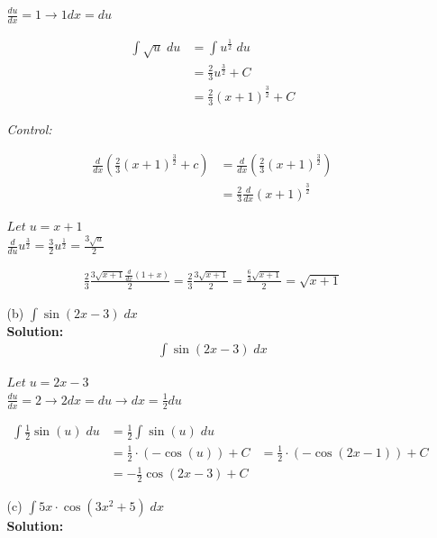 \documentclass[a4paper]{article}
\begin{document}
\begin{enumerate}
\begin{enumerate}
$\frac{du}{dx} = 1 \rightarrow 1dx = du$

\begin{align*}
\int \sqrt{u} \; du &= \int u^\frac{1}{2} \; du\\
&= \frac{2}{3}u^\frac{3}{2} + C\\
&= \frac{2}{3}(x+1)^\frac{3}{2} + C
\end{align*}	
	
\textit{Control:}

\begin{align*}
	\frac{d}{dx} (\frac{2}{3} (x + 1)^\frac{3}{2} + c) &= \frac{d}{dx}(\frac{2}{3}(x + 1)^\frac{3}{2})\\
	&= \frac{2}{3} \frac{d}{dx} (x+1)^\frac{3}{2}
\end{align*}

$Let \; u = x+1$\\ 

$\frac{d}{du} u^\frac{3}{2} = \frac{3}{2}u^\frac{1}{2} = \frac{3 \sqrt{u}}{2}$

\begin{align*}
	\frac{2}{3} \frac{3 \sqrt{x+1} \frac{d}{dx}(1 + x)}{2} = \frac{2}{3} \frac{3 \sqrt{x + 1}}{2} = \frac{\frac{6}{3}\sqrt{x + 1}}{2} = \sqrt{x + 1}
\end{align*}
	
	\item[(b)] $\int \sin(2x - 3) \; dx$\\
	\textbf{Solution:}\\
	

\begin{align*}
\int \sin(2x - 3) \; dx
\end{align*}	
	
$Let \; u = 2x - 3$\\ 

$\frac{du}{dx} = 2 \rightarrow 2dx = du \rightarrow dx = \frac{1}{2}du$	

\begin{align*}
\int \frac{1}{2}\sin(u) \; du &= \frac{1}{2} \int \sin(u) \; du\\
&= \frac{1}{2} \cdot (- \cos(u)) + C
&= \frac{1}{2} \cdot (- \cos(2x - 1)) + C\\
&= -\frac{1}{2} \cos(2x-3) + C
\end{align*}	
	
	\item[(c)] $\int 5x \cdot \cos(3x^2 + 5) \; dx$\\
\textbf{Solution:}\\	
	

\end{enumerate}
\end{enumerate}
\end{document}
